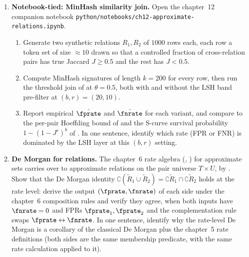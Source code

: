 \begin{enumerate}
\item \exstarstar
\label{ex:ch12-4}
\textbf{Notebook-tied: MinHash similarity join.}
Open the chapter~12 companion notebook
\texttt{python/notebooks/ch12-approximate-relations.ipynb}.
\begin{enumerate}
  \item[(a)] Generate two synthetic relations $R_1, R_2$ of $1000$
    rows each, each row a token set of size $\approx 10$ drawn so
    that a controlled fraction of cross-relation pairs has true
    Jaccard $J \ge 0.5$ and the rest has $J < 0.5$.
  \item[(b)] Compute MinHash signatures of length $k = 200$ for
    every row, then run the threshold join of
     at $\theta = 0.5$, both with and
    without the LSH band pre-filter at $(b, r) = (20, 10)$.
  \item[(c)] Report empirical $\hat\fprate$ and $\hat\fnrate$ for
    each variant, and compare to the per-pair Hoeffding bound of
     and the S-curve survival probability
    $1 - (1 - J^r)^b$ of . In one
    sentence, identify which rate (FPR or FNR) is dominated by the
    LSH layer at this $(b, r)$ setting.
\end{enumerate}

\item \exstarstar
\label{ex:ch12-5}
\textbf{De Morgan for relations.}
The chapter~6 rate algebra (,
) for approximate sets carries
over to approximate relations on the pair universe $T \times U$,
by . Show that the De Morgan identity
$\complement(\tilde R_1 \cup \tilde R_2) = \complement \tilde R_1
\cap \complement \tilde R_2$ holds at the rate level: derive the
output $(\fprate, \fnrate)$ of each side under the chapter~6
composition rules and verify they agree, when both inputs have
$\fnrate = 0$ and FPRs $\fprate_1, \fprate_2$ and the
complementation rule swaps $\fprate \leftrightarrow \fnrate$. In
one sentence, identify why the rate-level De Morgan is a corollary
of the classical De Morgan plus the chapter~5 rate definitions
(both sides are the same membership predicate, with the same rate
calculation applied to it).


\end{enumerate}
